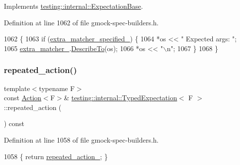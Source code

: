 Implements \hyperlink{classtesting_1_1internal_1_1ExpectationBase_a5ce4f648c7b112d27b798711d1e3ff5b}{testing\+::internal\+::\+Expectation\+Base}.



Definition at line 1062 of file gmock-\/spec-\/builders.\+h.


\begin{DoxyCode}
1062                                                            \{
1063     \textcolor{keywordflow}{if} (\hyperlink{classtesting_1_1internal_1_1ExpectationBase_a34f599ac7ae4f1fb7567e0d4c9fadcba}{extra\_matcher\_specified\_}) \{
1064       *os << \textcolor{stringliteral}{"    Expected args: "};
1065       \hyperlink{classtesting_1_1internal_1_1TypedExpectation_a7d2fef3d4429a3a350282e6030a45ba4}{extra\_matcher\_}.\hyperlink{classtesting_1_1internal_1_1MatcherBase_a7e0c883c7745e0d646463077ef1c1267}{DescribeTo}(os);
1066       *os << \textcolor{stringliteral}{"\(\backslash\)n"};
1067     \}
1068   \}
\end{DoxyCode}
\mbox{\label{classtesting_1_1internal_1_1TypedExpectation_a2b32621ac4d71c1a71893eb0499f723d}} 
\subsubsection{\texorpdfstring{repeated\+\_\+action()}{repeated\_action()}}
{\footnotesize\ttfamily template$<$typename F$>$ \\
const \hyperlink{classtesting_1_1Action}{Action}$<$F$>$\& \hyperlink{classtesting_1_1internal_1_1TypedExpectation}{testing\+::internal\+::\+Typed\+Expectation}$<$ F $>$\+::repeated\+\_\+action (\begin{DoxyParamCaption}{ }\end{DoxyParamCaption}) const\hspace{0.3cm}{\ttfamily [inline]}}



Definition at line 1058 of file gmock-\/spec-\/builders.\+h.


\begin{DoxyCode}
1058 \{ \textcolor{keywordflow}{return} \hyperlink{classtesting_1_1internal_1_1TypedExpectation_ac0ec406bd08a2260ede55650b3e16a62}{repeated\_action\_}; \}
\end{DoxyCode}
\mbox{\label{classtesting_1_1internal_1_1TypedExpectation_ae7c42958a5d2c336ba7a42a871bf7709}} 
